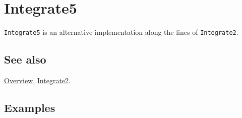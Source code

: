 \documentclass[../FeynCalcManual.tex]{subfiles}
\begin{document}
\hypertarget{integrate5}{
\section{Integrate5}\label{integrate5}}

\texttt{Integrate5} is an alternative implementation along the lines of
\texttt{Integrate2}.

\subsection{See also}

\hyperlink{toc}{Overview}, \hyperlink{integrate2}{Integrate2}.

\subsection{Examples}
\end{document}
